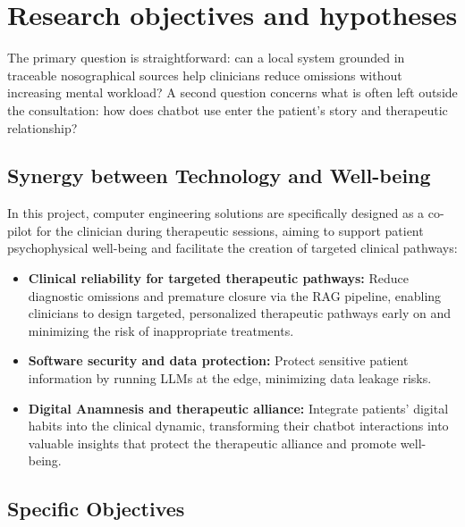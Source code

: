 \documentclass[11pt,a4paper]{article}
\begin{document}
\section{Research objectives and hypotheses}

The primary question is straightforward: can a local system grounded in traceable nosographical sources help clinicians reduce omissions without increasing mental workload? A second question concerns what is often left outside the consultation: how does chatbot use enter the patient's story and therapeutic relationship?

\subsection{Synergy between Technology and Well-being}

In this project, computer engineering solutions are specifically designed as a co-pilot for the clinician during therapeutic sessions, aiming to support patient psychophysical well-being and facilitate the creation of targeted clinical pathways:
\begin{itemize}
    \item \textbf{Clinical reliability for targeted therapeutic pathways:} Reduce diagnostic omissions and premature closure via the RAG pipeline, enabling clinicians to design targeted, personalized therapeutic pathways early on and minimizing the risk of inappropriate treatments.
    \item \textbf{Software security and data protection:} Protect sensitive patient information by running LLMs at the edge, minimizing data leakage risks.
    \item \textbf{Digital Anamnesis and therapeutic alliance:} Integrate patients' digital habits into the clinical dynamic, transforming their chatbot interactions into valuable insights that protect the therapeutic alliance and promote well-being.
\end{itemize}

\subsection{Specific Objectives}
\end{document}
